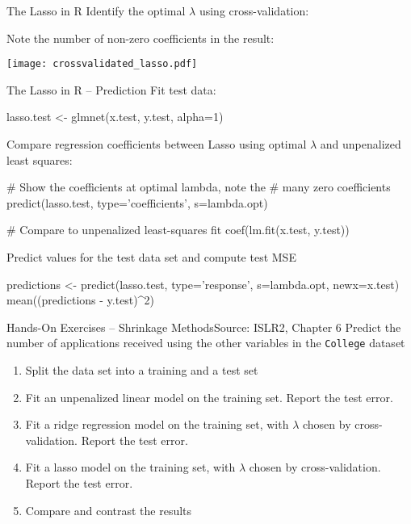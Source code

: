 \documentclass[ignorenonframetext,xcolor=x11names]{beamer}
\begin{document}
\begin{frame}[fragile]{The Lasso in R}
\small
Identify the optimal $\lambda$ using cross-validation:
Note the number of non-zero coefficients in the result:
\begin{center}
\texttt{[image: crossvalidated\_lasso.pdf]}
\end{center}
\end{frame}

\begin{frame}[fragile]{The Lasso in R -- Prediction}
Fit test data:
\begin{Rcode}
lasso.test <- glmnet(x.test, y.test, alpha=1)
\end{Rcode}
Compare regression coefficients between Lasso using optimal $\lambda$ and unpenalized least squares:
\begin{Rcode}
# Show the coefficients at optimal lambda, note the 
# many zero coefficients
predict(lasso.test, type='coefficients', s=lambda.opt)

# Compare to unpenalized least-squares fit
coef(lm.fit(x.test, y.test))
\end{Rcode}
Predict values for the test data set and compute test MSE
\begin{Rcode}
predictions <- predict(lasso.test, type='response', 
                       s=lambda.opt, newx=x.test)
mean((predictions - y.test)^2)
\end{Rcode}
\end{frame}

\begin{frame}{Hands-On Exercises -- Shrinkage Methods}{Source: ISLR2, Chapter 6}
Predict the number of applications received using the other variables in the \texttt{College} dataset
  \begin{enumerate} 
      \item Split the data set into a training and a test set
      \item Fit an unpenalized linear model on the training set. Report the test error.
      \item Fit a ridge regression model on the training set, with $\lambda$ chosen by cross-validation. Report the test error.
      \item Fit a lasso model on the training set, with $\lambda$ chosen by cross-validation. Report the test error.
      \item Compare and contrast the results
  \end{enumerate}
\end{frame}
\end{document}
